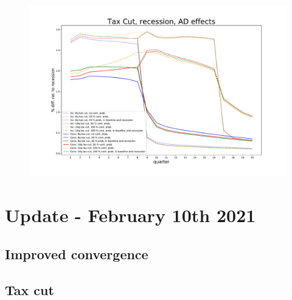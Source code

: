 \documentclass[]{article}
\begin{document}
\begin{figure}
	\includegraphics[width=1\linewidth]{../Continuation_Prob_Experiments/tax_cut_recession_AD_effects}
	\caption{}
	\label{fig:taxcutrecessionadeffects}
\end{figure}
	
	
	
	
	
\FloatBarrier
\section{Update - February 10th 2021}	


\FloatBarrier	
\subsection{Improved convergence}

\FloatBarrier
\subsection{Tax cut}
\end{document}
